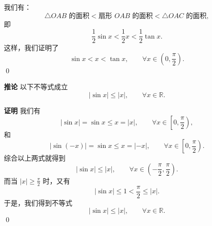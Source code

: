 \documentclass[12pt,a4paper,oneside]{ctexbook}
\begin{document}
我们有：
\[
\triangle OAB \text{ 的面积}
< \text{扇形 } OAB \text{ 的面积}
< \triangle OAC \text{ 的面积},
\]
即
\[
\frac{1}{2}\sin x<\frac{1}{2}x<\frac{1}{2}\tan x.
\]
这样，我们证明了
\[
\sin x<x<\tan x,\qquad \forall x\in \left(0,\frac{\pi}{2}\right).
\]
\qed

\medskip
\textbf{推论}\quad
以下不等式成立
\[
|\sin x|\le |x|,\qquad \forall x\in\mathbb{R}.
\]

\textbf{证明}\quad
我们有
\[
|\sin x|=\sin x\le x=|x|,
\qquad \forall x\in\left[0,\frac{\pi}{2}\right),
\]
和
\[
|\sin(-x)|=\sin x\le x=|-x|,
\qquad \forall x\in\left[0,\frac{\pi}{2}\right).
\]
综合以上两式就得到
\[
|\sin x|\le |x|,
\qquad \forall x\in\left(-\frac{\pi}{2},\frac{\pi}{2}\right).
\]
而当 $|x|\ge \frac{\pi}{2}$ 时，又有
\[
|\sin x|\le 1<\frac{\pi}{2}\le |x|.
\]
于是，我们得到不等式
\[
|\sin x|\le |x|,\qquad \forall x\in\mathbb{R}.
\]
\qed

\ifx\allfiles\undefined %
\end{document}
